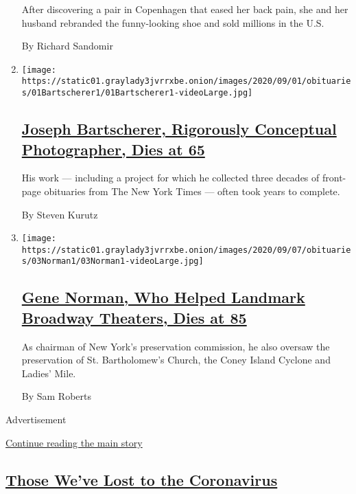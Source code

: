 \begin{enumerate}
  After discovering a pair in Copenhagen that eased her back pain, she
  and her husband rebranded the funny-looking shoe and sold millions in
  the U.S.

  By Richard Sandomir
\item
  \texttt{[image: https://static01.graylady3jvrrxbe.onion/images/2020/09/01/obituaries/01Bartscherer1/01Bartscherer1-videoLarge.jpg]}

  \hypertarget{joseph-bartscherer-rigorously-conceptual-photographer-dies-at-65}{%
  \subsection{\texorpdfstring{\href{/2020/09/05/arts/joseph-bartscherer-dead.html}{Joseph
  Bartscherer, Rigorously Conceptual Photographer, Dies at
  65}}{Joseph Bartscherer, Rigorously Conceptual Photographer, Dies at 65}}\label{joseph-bartscherer-rigorously-conceptual-photographer-dies-at-65}}

  His work --- including a project for which he collected three decades
  of front-page obituaries from The New York Times --- often took years
  to complete.

  By Steven Kurutz
\item
  \texttt{[image: https://static01.graylady3jvrrxbe.onion/images/2020/09/07/obituaries/03Norman1/03Norman1-videoLarge.jpg]}

  \hypertarget{gene-norman-who-helped-landmark-broadway-theaters-dies-at-85}{%
  \subsection{\texorpdfstring{\href{/2020/09/05/nyregion/gene-norman-dead.html}{Gene
  Norman, Who Helped Landmark Broadway Theaters, Dies at
  85}}{Gene Norman, Who Helped Landmark Broadway Theaters, Dies at 85}}\label{gene-norman-who-helped-landmark-broadway-theaters-dies-at-85}}

  As chairman of New York's preservation commission, he also oversaw the
  preservation of St. Bartholomew's Church, the Coney Island Cyclone and
  Ladies' Mile.

  By Sam Roberts
\end{enumerate}

Advertisement

\protect\hyperlink{after-mid1}{Continue reading the main story}

\hypertarget{those-weve-lost-to-the-coronavirus}{%
\subsection{\texorpdfstring{\href{/series/people-died-coronavirus-obituaries}{Those
We've Lost to the
Coronavirus}}{Those We've Lost to the Coronavirus}}\label{those-weve-lost-to-the-coronavirus}}

